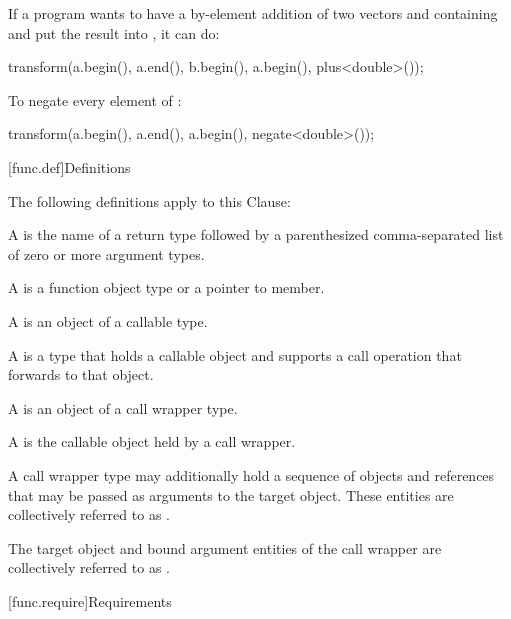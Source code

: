 \pnum
\begin{example}
If a \Cpp{} program wants to have a by-element addition of two vectors 
and  containing  and put the result into ,
it can do:

\begin{codeblock}
transform(a.begin(), a.end(), b.begin(), a.begin(), plus<double>());
\end{codeblock}
\end{example}

\pnum
\begin{example}
To negate every element of :

\begin{codeblock}
transform(a.begin(), a.end(), a.begin(), negate<double>());
\end{codeblock}

\end{example}

[func.def]{Definitions}

\pnum
The following definitions apply to this Clause:

\pnum
A  is the name of a return type followed by a
parenthesized comma-separated list of zero or more argument types.

\pnum
A  is a function object type or a pointer to member.

\pnum
A  is an object of a callable type.

\pnum
A  is a type that holds a callable object
and supports a call operation that forwards to that object.

\pnum
A  is an object of a call wrapper type.

\pnum
A  is the callable object held by a call wrapper.

\pnum
A call wrapper type may additionally hold
a sequence of objects and references
that may be passed as arguments to the target object.
These entities are collectively referred to
as .

\pnum
The target object and bound argument entities of the call wrapper are
collectively referred to as .

[func.require]{Requirements}

